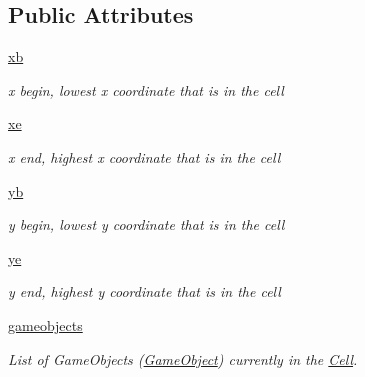 \subsection*{\-Public \-Attributes}
\begin{DoxyCompactItemize}
\item 
\hypertarget{classSpace_1_1Cell_a69795f2c1ed435d84d64b209be46a30e}{\hyperlink{classSpace_1_1Cell_a69795f2c1ed435d84d64b209be46a30e}{xb}}\label{classSpace_1_1Cell_a69795f2c1ed435d84d64b209be46a30e}

\begin{DoxyCompactList}\small\item\em x begin, lowest x coordinate that is in the cell \end{DoxyCompactList}\item 
\hypertarget{classSpace_1_1Cell_a1bfa638e3faed349d2d88438d8c57452}{\hyperlink{classSpace_1_1Cell_a1bfa638e3faed349d2d88438d8c57452}{xe}}\label{classSpace_1_1Cell_a1bfa638e3faed349d2d88438d8c57452}

\begin{DoxyCompactList}\small\item\em x end, highest x coordinate that is in the cell \end{DoxyCompactList}\item 
\hypertarget{classSpace_1_1Cell_aacd06f2c6f6e331d4ec03f93e62fa6d6}{\hyperlink{classSpace_1_1Cell_aacd06f2c6f6e331d4ec03f93e62fa6d6}{yb}}\label{classSpace_1_1Cell_aacd06f2c6f6e331d4ec03f93e62fa6d6}

\begin{DoxyCompactList}\small\item\em y begin, lowest y coordinate that is in the cell \end{DoxyCompactList}\item 
\hypertarget{classSpace_1_1Cell_a67848a0ad69098bdb539b063de16bab9}{\hyperlink{classSpace_1_1Cell_a67848a0ad69098bdb539b063de16bab9}{ye}}\label{classSpace_1_1Cell_a67848a0ad69098bdb539b063de16bab9}

\begin{DoxyCompactList}\small\item\em y end, highest y coordinate that is in the cell \end{DoxyCompactList}\item 
\hypertarget{classSpace_1_1Cell_a38b3f9f8f3c04995fb5f3c48e15229ba}{\hyperlink{classSpace_1_1Cell_a38b3f9f8f3c04995fb5f3c48e15229ba}{gameobjects}}\label{classSpace_1_1Cell_a38b3f9f8f3c04995fb5f3c48e15229ba}

\begin{DoxyCompactList}\small\item\em \-List of \-Game\-Objects (\hyperlink{namespaceGameObject}{\-Game\-Object}) currently in the \hyperlink{classSpace_1_1Cell}{\-Cell}. \end{DoxyCompactList}\end{DoxyCompactItemize}



